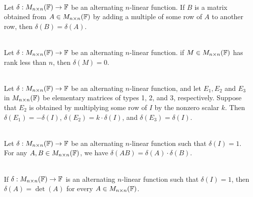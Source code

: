\begin{corollary}
	\hfill\\
	Let $\delta: M_{n \times n}(\mathbb{F}) \to \mathbb{F}$ be an alternating $n$-linear function. If $B$ is a matrix obtained from $A \in M_{n \times n}(\mathbb{F})$ by adding a multiple of some row of $A$ to another row, then $\delta(B) = \delta(A)$.
\end{corollary}

\begin{corollary}
	\hfill\\
	Let $\delta: M_{n \times n}(\mathbb{F}) \to \mathbb{F}$ be an alternating $n$-linear function. if $M \in M_{n \times n}(\mathbb{F})$ has rank less than $n$, then $\delta(M) = 0$.
\end{corollary}

\begin{corollary}
	\hfill\\
	Let $\delta: M_{n \times n}(\mathbb{F}) \to \mathbb{F}$ be an alternating $n$-linear function, and let $E_1, E_2$ and $E_3$ in $M_{n \times n}(\mathbb{F})$ be elementary matrices of types 1, 2, and 3, respectively. Suppose that $E_2$ is obtained by multiplying some row of $I$ by the nonzero scalar $k$. Then $\delta(E_1) = -\delta(I)$, $\delta(E_2) = k \cdot \delta(I)$, and $\delta(E_3) = \delta(I)$.
\end{corollary}

\begin{theorem}
	\hfill\\
	Let $\delta: M_{n \times n}(\mathbb{F}) \to \mathbb{F}$ be an alternating $n$-linear function such that $\delta(I) = 1$. For any $A,B \in M_{n \times n}(\mathbb{F})$, we have $\delta(AB) = \delta(A) \cdot \delta(B)$.
\end{theorem}

\begin{theorem}
	\hfill\\
	If $\delta: M_{n \times n}(\mathbb{F}) \to \mathbb{F}$ is an alternating $n$-linear function such that $\delta(I) = 1$, then $\delta(A) = \det(A)$ for every $A \in M_{n \times n}(\mathbb{F})$.
\end{theorem}